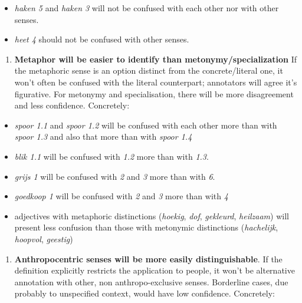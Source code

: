 \documentclass[
]{book}
\providecommand{\tightlist}{%
  \setlength{\itemsep}{0pt}\setlength{\parskip}{0pt}}
\begin{document}
\begin{itemize}
\tightlist
\item
  \emph{haken 5} and \emph{haken 3} will not be confused with each other nor with other senses.
\item
  \emph{heet 4} should not be confused with other senses.
\end{itemize}

\begin{enumerate}
\def\labelenumi{\arabic{enumi}.}
\setcounter{enumi}{1}
\tightlist
\item
  \textbf{Metaphor will be easier to identify than metonymy/specialization}
  If the metaphoric sense is an option distinct from the concrete/literal one, it won't often be confused with the literal counterpart; annotators will agree it's figurative. For metonymy and specialisation, there will be more disagreement and less confidence.
  Concretely:
\end{enumerate}

\begin{itemize}
\tightlist
\item
  \emph{spoor 1.1} and \emph{spoor 1.2} will be confused with each other more than with \emph{spoor 1.3} and also that more than with \emph{spoor 1.4}
\item
  \emph{blik 1.1} will be confused with \emph{1.2} more than with \emph{1.3}.
\item
  \emph{grijs 1} will be confused with \emph{2} and \emph{3} more than with \emph{6}.
\item
  \emph{goedkoop 1} will be confused with \emph{2} and \emph{3} more than with \emph{4}
\item
  adjectives with metaphoric distinctions (\emph{hoekig}, \emph{dof}, \emph{gekleurd}, \emph{heilzaam}) will present less confusion than those with metonymic distinctions (\emph{hachelijk}, \emph{hoopvol}, \emph{geestig})
\end{itemize}

\begin{enumerate}
\def\labelenumi{\arabic{enumi}.}
\setcounter{enumi}{2}
\tightlist
\item
  \textbf{Anthropocentric senses will be more easily distinguishable}.
  If the definition explicitly restricts the application to people, it won't be alternative annotation with other, non anthropo-exclusive senses. Borderline cases, due probably to unspecified context, would have low confidence.
  Concretely:
\end{enumerate}
\end{document}
